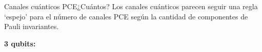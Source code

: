 \documentclass[xcolor=dvipsnames,presentation]{beamer}%
\begin{document}
\begin{frame}{Canales cuánticos PCE}{¿Cuántos?}
Los canales cuánticos parecen seguir una regla `espejo' para 
el número de canales PCE según la cantidad de componentes 
de Pauli invariantes. \pause

\vfill

\textbf{3 qubits:}
\begin{table}[]
\centering
%

\end{table}
\end{frame}
\end{document}
